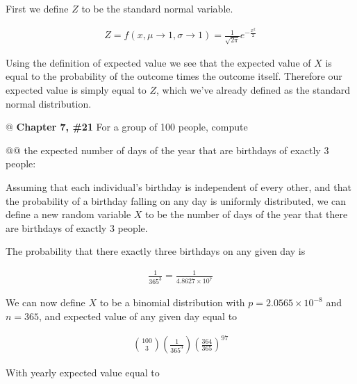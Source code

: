 \documentclass[11pt]{article}\usepackage[]{graphicx}\usepackage[]{xcolor}
\begin{document}
\begin{easylist}[enumerate]
    First we define $Z$ to be the standard normal variable.

    \begin{equation*}
        \begin{aligned}
            Z = f(x, \mu \to 1, \sigma \to 1) = \frac{1}{\sqrt{2\pi} } e^{ -\frac{x^2}{2} }
        \end{aligned}
    \end{equation*}

    Using the definition of expected value we see that the expected value of $X$ is equal to the probability of the
    outcome times the outcome itself. Therefore our expected value is simply equal to $Z$, which we've already defined
    as the standard normal distribution.

    @ \textbf{Chapter 7, \#21} For a group of 100 people, compute

    @@ the expected number of days of the year that are birthdays of exactly 3 people:\newline

    Assuming that each individual's birthday is independent of every other, and that the probability of a birthday
    falling on any day is uniformly distributed, we can define a new random variable $X$ to be the number of days of the
    year that there are birthdays of exactly 3 people.\newline

    The probability that there exactly three birthdays on any given day is

    \begin{equation*}
        \begin{aligned}
            \frac{1}{365^3} = \frac{1}{\ensuremath{4.8627\times 10^{7} } }
        \end{aligned}
    \end{equation*}

    We can now define $X$ to be a binomial distribution with $p=\ensuremath{2.0565\times 10^{-8} }$ and $n=365$, and expected value of any
    given day equal to

    \begin{equation*}
        \begin{aligned}
            {100 \choose 3} \left( \frac{1}{365^3} \right) {\left( \frac{364}{365} \right)}^{97}
        \end{aligned}
    \end{equation*}

    With yearly expected value equal to


\end{easylist}
\end{document}
